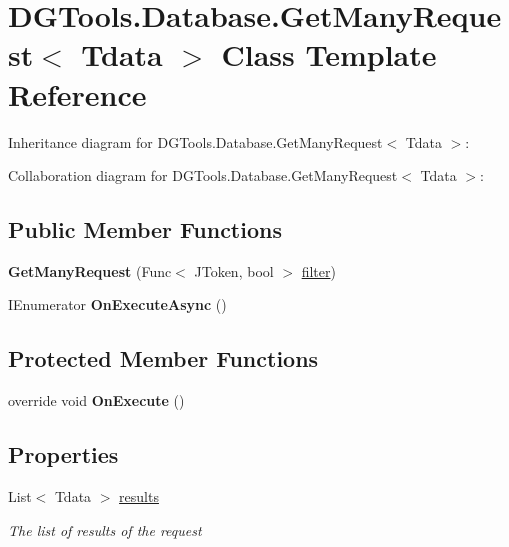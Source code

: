 \hypertarget{class_d_g_tools_1_1_database_1_1_get_many_request}{}\section{D\+G\+Tools.\+Database.\+Get\+Many\+Request$<$ Tdata $>$ Class Template Reference}
\label{class_d_g_tools_1_1_database_1_1_get_many_request}


Inheritance diagram for D\+G\+Tools.\+Database.\+Get\+Many\+Request$<$ Tdata $>$\+:


Collaboration diagram for D\+G\+Tools.\+Database.\+Get\+Many\+Request$<$ Tdata $>$\+:
\subsection*{Public Member Functions}
\begin{DoxyCompactItemize}
\item 
\mbox{\label{class_d_g_tools_1_1_database_1_1_get_many_request_a7518d8bffe0b2631e172fa68e5a97ef3}} 
{\bfseries Get\+Many\+Request} (Func$<$ J\+Token, bool $>$ \mbox{\hyperlink{class_d_g_tools_1_1_database_1_1_get_request_aeb636422673999df2a0511b1507428cb}{filter}})
\item 
\mbox{\label{class_d_g_tools_1_1_database_1_1_get_many_request_aba04aadc9edb84ee0eae6bec35974c75}} 
I\+Enumerator {\bfseries On\+Execute\+Async} ()
\end{DoxyCompactItemize}
\subsection*{Protected Member Functions}
\begin{DoxyCompactItemize}
\item 
\mbox{\label{class_d_g_tools_1_1_database_1_1_get_many_request_a846cd53f9bb3eb9d458d5db0ec190a22}} 
override void {\bfseries On\+Execute} ()
\end{DoxyCompactItemize}
\subsection*{Properties}
\begin{DoxyCompactItemize}
\item 
List$<$ Tdata $>$ \mbox{\hyperlink{class_d_g_tools_1_1_database_1_1_get_many_request_a325bb1ce74fcf52a3a80026f2789c14a}{results}}
\begin{DoxyCompactList}\small\item\em The list of results of the request \end{DoxyCompactList}\end{DoxyCompactItemize}


